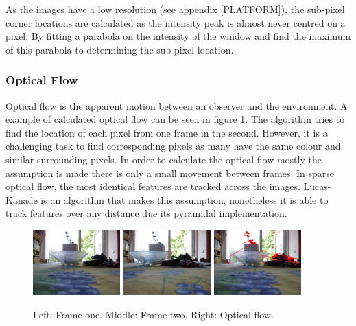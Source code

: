 \documentclass[a4paper]{article}
\begin{document}
As the images have a low resolution (see appendix \ref{PLATFORM}), the sub-pixel corner locations are calculated as the intensity peak is almost never centred on a pixel. By fitting a parabola on the intensity of the window and find the maximum of this parabola to determining the sub-pixel location.

\subsubsection{Optical Flow}
Optical flow is the apparent motion between an observer and the environment. A example of calculated optical flow can be seen in figure \ref{opticflow}. The algorithm tries to find the location of each pixel from one frame in the second. However, it is a challenging task to find corresponding pixels as many have the same colour and similar surrounding pixels. In order to calculate the optical flow mostly the assumption is made there is only a small movement between frames. In sparse optical flow, the most identical features are tracked across the images. Lucas-Kanade is an algorithm that makes this assumption, nonetheless it is able to track features over any distance due its pyramidal implementation.\\

\begin{figure}[!ht]
\centering
\includegraphics[width=0.3\textwidth]{images/frame0.jpg}
\includegraphics[width=0.3\textwidth]{images/frame1.jpg} \includegraphics[width=0.3\textwidth]{images/optical_flow.png}
\caption{Left: Frame one. Middle: Frame two. Right: Optical flow.}
\label{opticflow}
\end{figure}
\end{document}
